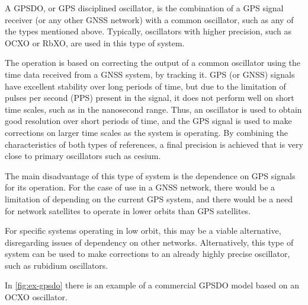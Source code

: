 


A GPSDO, or GPS disciplined oscillator, is the combination of a GPS signal receiver (or any other GNSS network) with a common oscillator, such as any of the types mentioned above. Typically, oscillators with higher precision, such as OCXO or RbXO, are used in this type of system.

The operation is based on correcting the output of a common oscillator using the time data received from a GNSS system, by tracking it. GPS (or GNSS) signals have excellent stability over long periods of time, but due to the limitation of pulses per second (PPS) present in the signal, it does not perform well on short time scales, such as in the nanosecond range. Thus, an oscillator is used to obtain good resolution over short periods of time, and the GPS signal is used to make corrections on larger time scales as the system is operating. By combining the characteristics of both types of references, a final precision is achieved that is very close to primary oscillators such as cesium.

The main disadvantage of this type of system is the dependence on GPS signals for its operation. For the case of use in a GNSS network, there would be a limitation of depending on the current GPS system, and there would be a need for network satellites to operate in lower orbits than GPS satellites.

For specific systems operating in low orbit, this may be a viable alternative, disregarding issues of dependency on other networks. Alternatively, this type of system can be used to make corrections to an already highly precise oscillator, such as rubidium oscillators.

In \autoref{fig:ex-gpsdo} there is an example of a commercial GPSDO model based on an OCXO oscillator.

